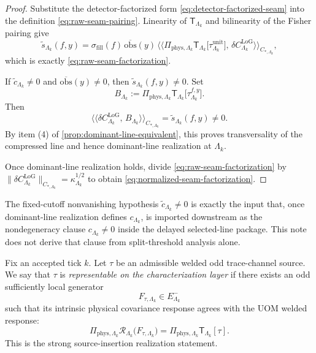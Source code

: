 \documentclass[11pt]{article}
\begin{document}
\begin{proof}
Substitute the detector-factorized form \eqref{eq:detector-factorized-seam} into the definition
\eqref{eq:raw-seam-pairing}.
Linearity of \(\mathsf T_{\Lambda_k}\) and bilinearity of the Fisher pairing give
\[
\widetilde s_{\Lambda_k}(f,y)
=
\sigma_{\mathrm{fill}}(f)\,\overline{\mathrm{obs}}(y)\,
\big\langle\!\big\langle
\Pi_{\mathrm{phys},\Lambda_k}\mathsf T_{\Lambda_k}\!\big[\tau^{\mathrm{unit}}_{\Lambda_k}\big],\,
\delta C^{\mathrm{LoG}}_{\Lambda_k}
\big\rangle\!\big\rangle_{C_{\ast,\Lambda_k}},
\]
which is exactly \eqref{eq:raw-seam-factorization}.

If \(\widetilde c_{\Lambda_k}\neq 0\) and \(\overline{\mathrm{obs}}(y)\neq 0\), then
\(
\widetilde s_{\Lambda_k}(f,y)\neq 0
\).
Set
\[
B_{\Lambda_k}
:=
\Pi_{\mathrm{phys},\Lambda_k}\mathsf T_{\Lambda_k}\!\big[\tau^{f,y}_{\Lambda_k}\big].
\]
Then
\[
\big\langle\!\big\langle
\delta C^{\mathrm{LoG}}_{\Lambda_k},\,B_{\Lambda_k}
\big\rangle\!\big\rangle_{C_{\ast,\Lambda_k}}
=
\widetilde s_{\Lambda_k}(f,y)
\neq 0.
\]
By item (4) of \cref{prop:dominant-line-equivalent}, this proves transversality of the compressed
line and hence dominant-line realization at \(\Lambda_k\).

Once dominant-line realization holds, divide \eqref{eq:raw-seam-factorization} by
\(
\|\delta C^{\mathrm{LoG}}_{\Lambda_k}\|_{C_{\ast,\Lambda_k}}
=
\kappa_{\Lambda_k}^{1/2}
\)
to obtain \eqref{eq:normalized-seam-factorization}.
\end{proof}

\begin{remark}
The fixed-cutoff nonvanishing hypothesis
\(
\widetilde c_{\Lambda_k}\neq 0
\)
is exactly the input that, once dominant-line realization defines
\(
c_{\Lambda_k}
\),
is imported downstream as the nondegeneracy clause
\(
c_{\Lambda_k}\neq 0
\)
inside the delayed selected-line package.
This note does not derive that clause from split-threshold analysis alone.
\end{remark}

\begin{definition}
\label{def:odd-source-representability}
Fix an accepted tick \(k\).
Let \(\tau\) be an admissible welded odd trace-channel source.
We say that \(\tau\) is \emph{representable on the characterization layer} if there exists an odd
sufficiently local generator
\[
F_{\tau,\Lambda_k}\in E^-_{\Lambda_k}
\]
such that its intrinsic physical covariance response agrees with the UOM welded response:
\begin{equation}
\Pi_{\mathrm{phys},\Lambda_k}\mathcal R_{\Lambda_k}\!\big(F_{\tau,\Lambda_k}\big)
=
\Pi_{\mathrm{phys},\Lambda_k}\mathsf T_{\Lambda_k}[\tau].
\label{eq:odd-source-representability}
\end{equation}
This is the strong source-insertion realization statement.
\end{definition}
\end{document}
